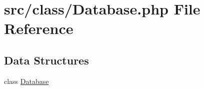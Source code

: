 \hypertarget{_database_8php}{}\section{src/class/\+Database.php File Reference}
\label{_database_8php}
\subsection*{Data Structures}
\begin{DoxyCompactItemize}
\item 
class \hyperlink{class_database}{Database}
\end{DoxyCompactItemize}
